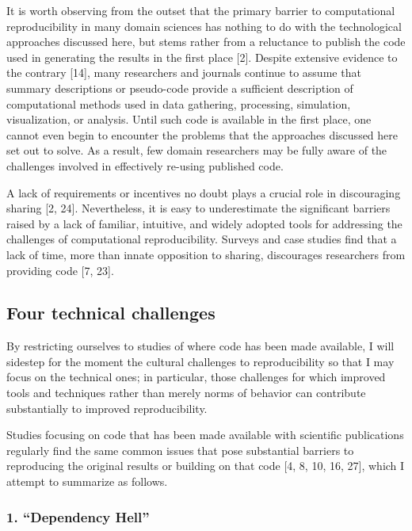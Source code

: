 \documentclass[9pt]{components/acm_proc_article-sp}
\begin{document}
It is worth observing from the outset that the primary barrier to
computational reproducibility in many domain sciences has nothing to do
with the technological approaches discussed here, but stems rather from
a reluctance to publish the code used in generating the results in the
first place {[}2{]}. Despite extensive evidence to the contrary
{[}14{]}, many researchers and journals continue to assume that summary
descriptions or pseudo-code provide a sufficient description of
computational methods used in data gathering, processing, simulation,
visualization, or analysis. Until such code is available in the first
place, one cannot even begin to encounter the problems that the
approaches discussed here set out to solve. As a result, few domain
researchers may be fully aware of the challenges involved in effectively
re-using published code.

A lack of requirements or incentives no doubt plays a crucial role in
discouraging sharing {[}2, 24{]}. Nevertheless, it is easy to
underestimate the significant barriers raised by a lack of familiar,
intuitive, and widely adopted tools for addressing the challenges of
computational reproducibility. Surveys and case studies find that a lack
of time, more than innate opposition to sharing, discourages researchers
from providing code {[}7, 23{]}.

\subsection{Four technical challenges}\label{four-technical-challenges}

By restricting ourselves to studies of where code has been made
available, I will sidestep for the moment the cultural challenges to
reproducibility so that I may focus on the technical ones; in
particular, those challenges for which improved tools and techniques
rather than merely norms of behavior can contribute substantially to
improved reproducibility.

Studies focusing on code that has been made available with scientific
publications regularly find the same common issues that pose substantial
barriers to reproducing the original results or building on that code
{[}4, 8, 10, 16, 27{]}, which I attempt to summarize as follows.

\subsubsection{1. \textbf{``Dependency Hell''}}\label{dependency-hell}
\end{document}
